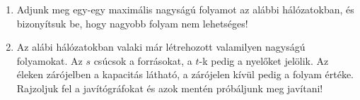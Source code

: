 \documentclass[a4paper, 12pt]{article}
\begin{document}
\begin{enumerate}
            \item Adjunk meg egy-egy maximális nagyságú folyamot az alábbi hálózatokban, és bizonyítsuk be, hogy nagyobb folyam nem lehetséges!
            \begin{figure}[!h]
                \centering
                \begin{subfigure}{0.4\textwidth}
                    \centering		
                    
                \end{subfigure}
                \begin{subfigure}{0.4\textwidth}
                    \centering
                    
                \end{subfigure}
            \end{figure}
            \item Az alábi hálózatokban valaki már létrehozott valamilyen nagyságú folyamokat. Az $s$ csúcsok a forrásokat, a $t$-k pedig a nyelőket jelölik. Az éleken zárójelben a kapacitás látható, a zárójelen kívül pedig a folyam értéke. Rajzoljuk fel a javítógráfokat és azok mentén próbáljunk meg javítani!
            \begin{figure}[!h]
                \centering
                \begin{subfigure}{0.24\textwidth}
                    \centering		
                    
                \end{subfigure}
                \begin{subfigure}{0.24\textwidth}
                    \centering
                    
                \end{subfigure}
                \begin{subfigure}{0.24\textwidth}
                    \centering
                    
                \end{subfigure}
                \begin{subfigure}{0.24\textwidth}
                    \centering
                    
                \end{subfigure}
            \end{figure}


\end{enumerate}
\end{document}
